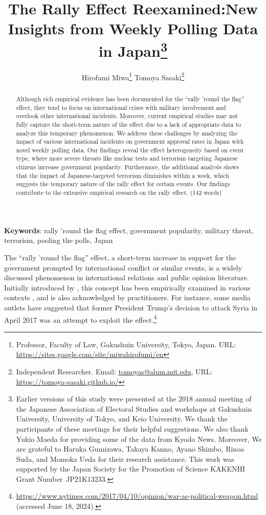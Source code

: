 \documentclass[letterpaper,12pt]{scrartcl}
\title{
  \textbf{\textsf{\LARGE The Rally Effect Reexamined:\linebreak New Insights from Weekly Polling Data in Japan}}\if0\blind\thanks{\hspace{3mm}Earlier versions of this study were presented at the 2018 annual meeting of the Japanese Association of Electoral Studies and workshops at Gakushuin University, University of Tokyo, and Keio University. We thank the participants of these meetings for their helpful suggestions. We also thank Yukio Maeda for providing some of the data from Kyodo News. Moreover, We are grateful to Haruka Gumizawa, Takaya Kanno, Ayano Shimbo, Rinoa Suda, and Momoka Ueda for their research assistance. This work was supported by the Japan Society for the Promotion of Science KAKENHI Grant Number~JP21K13233.} \fi
}
\author{
  \if0\blind
  \hspace{1.5in}
  Hirofumi Miwa\thanks{Professor, Faculty of Law, Gakushuin University,
  Tokyo, Japan. URL: \href{https://sites.google.com/site/miwahirofumi/en}{https://sites.google.com/site/miwahirofumi/en}}
  \hspace{.7in}
  Tomoya Sasaki\thanks{Independent Researcher. Email:
  \href{mailto:tomoyas@alum.mit.edu}{tomoyas@alum.mit.edu},
  URL: \href{https://tomoya-sasaki.github.io/}{https://tomoya-sasaki.github.io/}}
  \fi
}
\date{}
\renewcommand{\footnotelayout}{\setstretch{1}}
\begin{document}
\maketitle
\thispagestyle{empty}
\setcounter{page}{0}
\parindent=20pt

\vspace{-5mm}
\begin{abstract}
\noindent
Although rich empirical evidence has been documented for the ``rally 'round the flag'' effect, they tend to focus on international crises with military involvement and overlook other international incidents. Moreover, current empirical studies may not fully capture the short-term nature of the effect due to a lack of appropriate data to analyze this temporary phenomenon. We address these challenges by analyzing the impact of various international incidents on government approval rates in Japan with novel weekly polling data. Our findings reveal the effect heterogeneity based on event type, where more severe threats like nuclear tests and terrorism targeting Japanese citizens increase government popularity. Furthermore, the additional analysis shows that the impact of Japanese-targeted terrorism diminishes within a week, which suggests the temporary nature of the rally effect for certain events. Our findings contribute to the extensive empirical research on the rally effect. (142 words)
\end{abstract}

\bigskip
\bigskip
\noindent \textbf{Keywords}: rally 'round the flag effect, government popularity, military threat, terrorism, pooling the polls, Japan

\newpage
\doublespacing

\noindent
The ``rally 'round the flag'' effect, a short-term increase in support for the government prompted by international conflict or similar events, is a widely discussed phenomenon in international relations and public opinion literature. Initially introduced by \citet{Mueller1970APSR}, this concept has been empirically examined in various contexts \citep[e.g.,][]{Oneal1995PolitBehav,Baker2001JCR,Chapman2004JCR,Lai2005ISQ,seo2023}, and is also acknowledged by practitioners. For instance, some media outlets have suggested that former President Trump's decision to attack Syria in April 2017 was an attempt to exploit the effect.\footnote{\url{https://www.nytimes.com/2017/04/10/opinion/war-as-political-weapon.html} (accessed June 18, 2024).}
\end{document}
